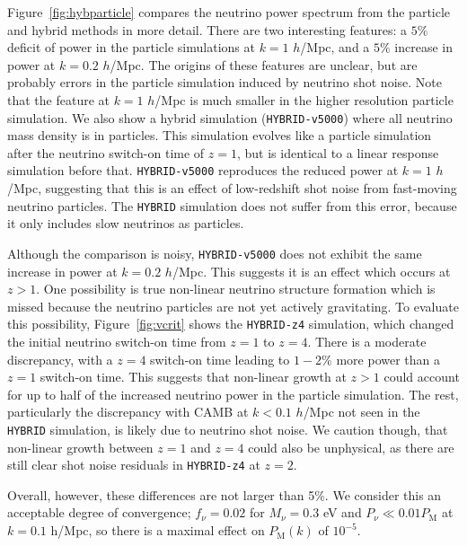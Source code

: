 \documentclass[useAMS, usenatbib]{mnras}
\begin{document}
Figure~\ref{fig:hybparticle} compares the neutrino power spectrum from the particle and hybrid methods in more detail. There are two interesting features: a $5\%$ deficit of power in the particle simulations at $k=1$ $h$/Mpc, and a $5\%$ increase in power at $k=0.2$ $h$/Mpc. The origins of these features are unclear, but are probably errors in the particle simulation induced by neutrino shot noise. Note that the feature at $k=1$ $h$/Mpc is much smaller in the higher resolution particle simulation. We also show a hybrid simulation (\texttt{HYBRID-v5000}) where all neutrino mass density is in particles. This simulation evolves like a particle simulation after the neutrino switch-on time of $z=1$, but is identical to a linear response simulation before that. \texttt{HYBRID-v5000} reproduces the reduced power at $k=1$ $h$/Mpc, suggesting that this is an effect of low-redshift shot noise from fast-moving neutrino particles. The \texttt{HYBRID} simulation does not suffer from this error, because it only includes slow neutrinos as particles.

Although the comparison is noisy, \texttt{HYBRID-v5000} does not exhibit the same increase in power at $k=0.2$ $h$/Mpc. This suggests it is an effect which occurs at $z > 1$. One possibility is true non-linear neutrino structure formation which is missed because the neutrino particles are not yet actively gravitating. To evaluate this possibility, Figure~\ref{fig:vcrit} shows the \texttt{HYBRID-z4} simulation, which changed the initial neutrino switch-on time from $z=1$ to $z=4$. There is a moderate discrepancy, with a $z=4$ switch-on time leading to $1-2\%$ more power than a $z=1$ switch-on time. This suggests that non-linear growth at $z> 1$ could account for up to half of the increased neutrino power in the particle simulation. The rest, particularly the discrepancy with CAMB at $k < 0.1$ $h$/Mpc not seen in the \texttt{HYBRID} simulation, is likely due to neutrino shot noise. We caution though, that non-linear growth between $z=1$ and $z=4$ could also be unphysical, as there are still clear shot noise residuals in \texttt{HYBRID-z4} at $z = 2$.

Overall, however, these differences are not larger than 5\%. We consider this an acceptable degree of convergence; $f_\nu = 0.02$ for $M_\nu = 0.3$ eV and $P_\nu \ll 0.01 P_\mathrm{M}$ at $k = 0.1$ h/Mpc, so there is a maximal effect on $P_\mathrm{M}(k)$ of $10^{-5}$.
\end{document}
